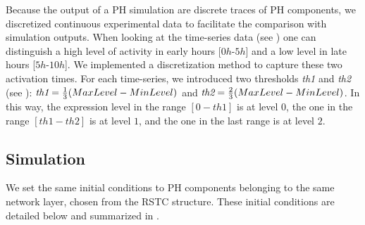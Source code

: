 Because the output of a PH simulation are discrete traces of PH components, we discretized continuous experimental data to facilitate 
the comparison with simulation outputs.
When looking at the time-series data (see ) one can distinguish a high level of
activity in early hours [$0h$-$5h$] and a low level in late hours [$5h$-$10h$]. We implemented a discretization method to capture these
two activation times. For each time-series, we introduced two thresholds \emph{th1} and \emph{th2} (see ): 
$\emph{th1}=\frac{1}{3}(MaxLevel-MinLevel)$ and $\emph{th2}=\frac{2}{3}(MaxLevel-MinLevel)$. 
In this way, the expression level in the range $[0-th1]$ is at level $0$, the one in the range $[th1-th2]$ is at level $1$, and the one in the last range is at
level $2$. 


\subsection{Simulation}

We set the same initial conditions to PH components belonging to the same network layer, chosen from the RSTC structure.
These initial conditions are detailed below and summarized in .

